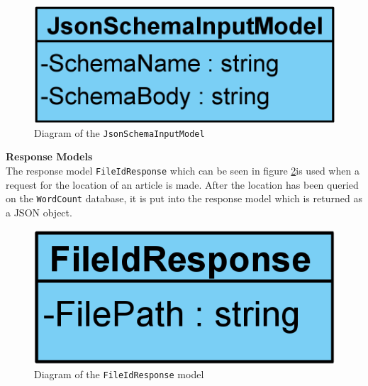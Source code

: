 \begin{figure}[H]
    \centering
    \includegraphics[scale=0.25]{Images/JsonSchemaInputModel.png}
    \caption{Diagram of the \texttt{JsonSchemaInputModel}}
    \label{JsonSchemaInputModel}
\end{figure}

\textbf{Response Models}\\
The response model \texttt{FileIdResponse} which can be seen in figure \ref*{FileIdResponse}is used when a request for the location of an article is made. 
After the location has been queried on the \texttt{WordCount} database, it is put into the response model which is returned as a JSON object.

\begin{figure}[H]
    \centering
    \includegraphics[scale=0.25]{Images/FileIdResponse.png}
    \caption{Diagram of the \texttt{FileIdResponse} model}
    \label{FileIdResponse}
\end{figure}


